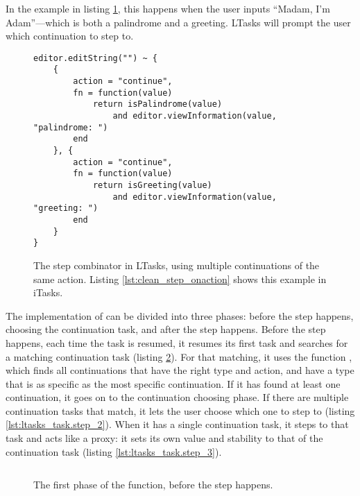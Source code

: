 In the example in listing \ref{lst:ltasks_step}, this happens when the user inputs ``Madam, I'm Adam''---which is both a palindrome and a greeting. LTasks will prompt the user which continuation to step to.


\begin{figure}
\centering
\begin{verbatim}
editor.editString("") ~ {
    {
        action = "continue",
        fn = function(value)
            return isPalindrome(value)
                and editor.viewInformation(value, "palindrome: ")
        end
    }, {
        action = "continue",
        fn = function(value)
            return isGreeting(value)
                and editor.viewInformation(value, "greeting: ")
        end
    }
}
\end{verbatim}
\caption{The step combinator in LTasks, using multiple  continuations of the same action. Listing \ref{lst:clean_step_onaction} shows this example in iTasks.}
\label{lst:ltasks_step}
\end{figure}

The implementation of  can be divided into three phases: before the step happens, choosing the continuation task, and after the step happens.
Before the step happens, each time the  task is resumed, it resumes its first task and searches for a matching continuation task (listing \ref{lst:ltasks_task.step_1}). For that matching, it uses the function , which finds all continuations that have the right type and action, and have a type that is as specific as the most specific continuation.
If it has found at least one continuation, it goes on to the continuation choosing phase. If there are multiple continuation tasks that match, it lets the user choose which one to step to (listing \ref{lst:ltasks_task.step_2}).
When it has a single continuation task, it steps to that task and acts like a proxy: it sets its own value and stability to that of the continuation task (listing \ref{lst:ltasks_task.step_3}).


\begin{figure}
\centering
\inputminted[linenos, firstline=93, lastline=106]{lua}{code/task.lua}
\vspace{-\baselineskip}
\caption{The first phase of the  function, before the step happens.}
\label{lst:ltasks_task.step_1}
\end{figure}

